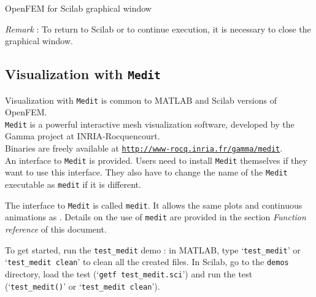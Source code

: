 \newpage
\begin{center}
\begin{figure}[H]
\centering
{} %
\end{figure}

OpenFEM for Scilab graphical window
\end{center}
\emph{Remark} : To return to Scilab or to continue execution, it is necessary to close the graphical window.

\newpage
\subsection{Visualization with {\tt Medit} \label{visumedit}}
Visualization with {\tt Medit} is common to MATLAB and Scilab versions of OpenFEM.\\
{\tt Medit} is a powerful interactive mesh visualization software, developed by the Gamma project at INRIA-Rocquencourt.\\Binaries are freely available at \href{http://www-rocq.inria.fr/gamma/medit}{{\tt http://www-rocq.inria.fr/gamma/medit}}.\\
An interface to {\tt Medit} is provided. Users need to install {\tt Medit} themselves if they want to use this interface. They also have to change the name of the {\tt Medit} executable as {\tt medit} if it is different.

The interface to {\tt Medit} is called {\tt medit}. It allows the same plots and continuous animations as \feplot. Details on the use of {\tt medit} are provided in the section {\sl Function reference} of this document. 

To get started, run the  {\tt test\_medit} demo : in MATLAB, type `{\tt test\_medit}' or `{\tt test\_medit clean}' to clean all the created files. In Scilab, go to the {\tt demos} directory, load the test (`{\tt getf test\_medit.sci}') and run the test (`{\tt test\_medit()}' or `{\tt test\_medit clean}').

